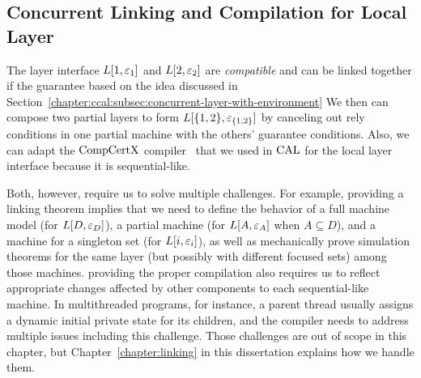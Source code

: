\subsection{Concurrent Linking and Compilation for Local Layer}
\label{chapter:ccal:subsec:concurrent-linking-and compilation-for-local-layer}

The layer interface $L[1, {\varepsilon}_1]$ and $L[2, {\varepsilon}_2]$ are  {\em compatible} and can be linked together if the guarantee based on
the idea discussed in Section~\ref{chapter:ccal:subsec:concurrent-layer-with-environment}
We then can compose two partial layers to form 
$L[\{1, 2\}, {\varepsilon}_{\{1, 2\}}]$ by canceling out rely conditions in one partial machine with the others' guarantee conditions.
Also, we can adapt the $\mathrm{CompCertX}$ compiler~\cite{deepspec} that we used in $\mathrm{CAL}$
for the local layer interface because it is sequential-like.

Both, however, require us to solve multiple challenges. 
For example, providing a linking theorem  
implies that we need to define the behavior of a full machine model (for $L[D, {\varepsilon}_{D}]$), a partial machine (for $L[A, {\varepsilon}_{A}]$ when $A \subseteq D$), and 
a machine for a singleton set (for $L[i, {\varepsilon}_{i}]$), as well as mechanically prove simulation theorems for the same layer (but possibly with different focused sets) among those machines. 
providing the proper compilation also requires 
us to reflect appropriate changes affected by other components to each sequential-like machine.
In multithreaded programs, for instance, a parent thread usually assigns a dynamic initial private state for its children,
and the compiler needs to address multiple issues including this challenge. 
Those challenges are out of scope in this chapter, but Chapter~\ref{chapter:linking} in this dissertation explains how we handle them.
